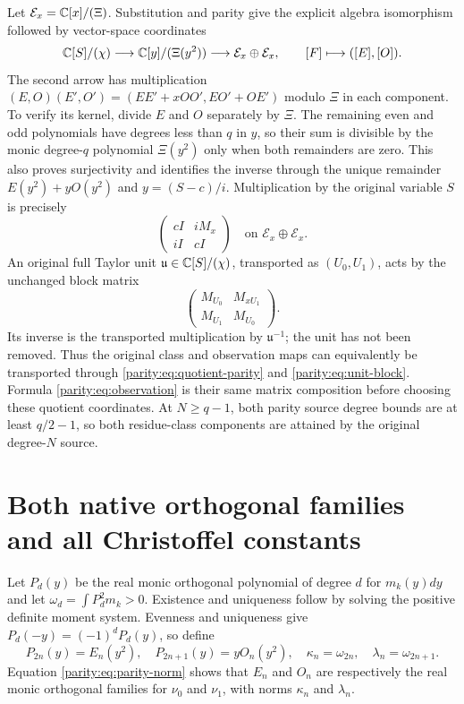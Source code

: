 Let $\mathcal E_x=\mathbb C[x]/(\Xi)$. Substitution and parity give the
explicit algebra isomorphism followed by vector-space coordinates
\begin{equation}\label{parity:eq:quotient-parity}
 \mathbb C[S]/(\chi)\longrightarrow\mathbb C[y]/(\Xi(y^2))
                  \longrightarrow\mathcal E_x\oplus\mathcal E_x,
 \qquad [F]\longmapsto([E],[O]).
\end{equation}
The second arrow has multiplication
$(E,O)(E',O')=(EE'+xOO',EO'+OE')$ modulo $\Xi$ in each component.
To verify its kernel, divide $E$ and $O$ separately by $\Xi$.
The remaining even and odd polynomials have degrees less than
$q$ in $y$, so their sum is divisible by the monic degree-$q$
polynomial $\Xi(y^2)$ only when both remainders are zero. This
also proves surjectivity and identifies the inverse through the
unique remainder $E(y^2)+yO(y^2)$ and $y=(S-c)/i$.
Multiplication by the original variable $S$ is precisely
\begin{equation}\label{parity:eq:S-block}
 \begin{pmatrix}cI&iM_x\\ iI&cI\end{pmatrix}
 \quad\text{on }\mathcal E_x\oplus\mathcal E_x.
\end{equation}
An original full Taylor unit $\mathfrak u\in\mathbb C[S]/(\chi)$,
transported as $(U_0,U_1)$, acts by the unchanged block matrix
\begin{equation}\label{parity:eq:unit-block}
 \begin{pmatrix}M_{U_0}&M_{xU_1}\\M_{U_1}&M_{U_0}\end{pmatrix}.
\end{equation}
Its inverse is the transported multiplication by
$\mathfrak u^{-1}$; the unit has not been removed. Thus the
original class and observation maps can equivalently be
transported through \eqref{parity:eq:quotient-parity} and
\eqref{parity:eq:unit-block}. Formula \eqref{parity:eq:observation} is their
same matrix composition before choosing these quotient
coordinates. At $N\geq q-1$, both parity source degree bounds
are at least $q/2-1$, so both residue-class components are
attained by the original degree-$N$ source.

\section{Both native orthogonal families and all Christoffel constants}

Let $P_d(y)$ be the real monic orthogonal polynomial of degree $d$
for $m_k(y)dy$ and let $\omega_d=\int P_d^2m_k>0$. Existence and
uniqueness follow by solving the positive definite moment system.
Evenness and uniqueness give $P_d(-y)=(-1)^dP_d(y)$, so define
\[
 P_{2n}(y)=E_n(y^2),\quad P_{2n+1}(y)=yO_n(y^2),
 \quad \kappa_n=\omega_{2n},\quad\lambda_n=\omega_{2n+1}.
\]
Equation \eqref{parity:eq:parity-norm} shows that $E_n$ and $O_n$ are
respectively the real monic orthogonal families for $\nu_0$ and
$\nu_1$, with norms $\kappa_n$ and $\lambda_n$.

